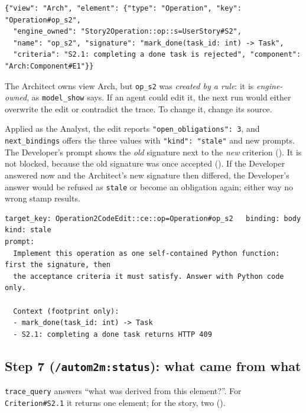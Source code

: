 \documentclass[10pt,a4paper]{article}
\newcommand{\cls}[1]{\textsf{#1}}
\newcommand{\code}[1]{\texttt{#1}}
\newcommand{\mcptool}[1]{\texttt{#1}}
\newcommand{\skill}[1]{\texttt{/autom2m:#1}}
\begin{document}
\begin{lstlisting}[style=engine, caption={Observed: \code{model\_show(view="Arch", key="Operation\#op\_s2")}.}, label={lst:w1show}]
{"view": "Arch", "element": {"type": "Operation", "key": "Operation#op_s2",
  "engine_owned": "Story2Operation::op::s=UserStory#S2",
  "name": "op_s2", "signature": "mark_done(task_id: int) -> Task",
  "criteria": "S2.1: completing a done task is rejected", "component": "Arch:Component#E1"}}
\end{lstlisting}

The Architect owns view \cls{Arch}, but \code{op\_s2} was \emph{created by a
rule}: it is \emph{engine-owned}, as \mcptool{model\_show} says. If an agent
could edit it, the next run would either overwrite the edit or contradict
the trace. To change it, change its source.

Applied as the Analyst, the edit reports \code{"open\_obligations": 3}, and
\mcptool{next\_bindings} offers the three values with \code{"kind":
"stale"} and new prompts. The Developer's prompt shows the \emph{old}
signature next to the \emph{new} criterion (). It is not
blocked, because the old signature was once accepted (). If
the Developer answered now and the Architect's new signature then differed,
the Developer's answer would be refused as \code{stale} or become an
obligation again; either way no wrong stamp results.

\begin{lstlisting}[style=llm, caption={Observed: the Developer's stale prompt after the change (rendered).}, label={lst:w1stale}]
target_key: Operation2CodeEdit::ce::op=Operation#op_s2   binding: body   kind: stale
prompt:
  Implement this operation as one self-contained Python function: first the signature, then
  the acceptance criteria it must satisfy. Answer with Python code only.

  Context (footprint only):
  - mark_done(task_id: int) -> Task
  - S2.1: completing a done task returns HTTP 409
\end{lstlisting}

\subsection{Step 7 (\skill{status}): what came from what}

\mcptool{trace\_query} answers ``what was derived from this element?''. For
\code{Criterion\#S2.1} it returns one element; for the story, two
().
\end{document}
